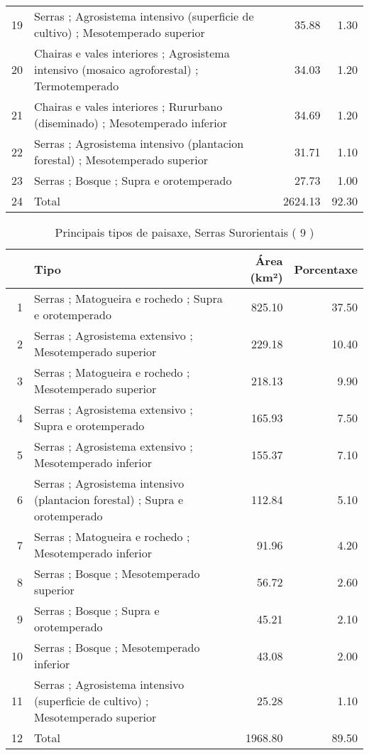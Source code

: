 \begin{table}[p]
\begin{tabular}{rlrr}
  19 & Serras ; Agrosistema intensivo (superficie de cultivo) ; Mesotemperado superior & 35.88 & 1.30 \\ 
  20 & Chairas e vales interiores ; Agrosistema intensivo (mosaico agroforestal) ; Termotemperado & 34.03 & 1.20 \\ 
  21 & Chairas e vales interiores ; Rururbano (diseminado) ; Mesotemperado inferior & 34.69 & 1.20 \\ 
  22 & Serras ; Agrosistema intensivo (plantacion forestal) ; Mesotemperado superior & 31.71 & 1.10 \\ 
  23 & Serras ; Bosque ; Supra e orotemperado & 27.73 & 1.00 \\ 
  24 & Total & 2624.13 & 92.30 \\ 
   \hline
\end{tabular}
\end{table}
\begin{table}[p]
\centering
\caption{Principais tipos de paisaxe,  Serras Surorientais ( 9 )} 
\label{Tipos 9}
\begin{tabular}{rlrr}
  \hline
 & Tipo & Área (km²) & Porcentaxe \\ 
  \hline
1 & Serras ; Matogueira e rochedo ; Supra e orotemperado & 825.10 & 37.50 \\ 
  2 & Serras ; Agrosistema extensivo ; Mesotemperado superior & 229.18 & 10.40 \\ 
  3 & Serras ; Matogueira e rochedo ; Mesotemperado superior & 218.13 & 9.90 \\ 
  4 & Serras ; Agrosistema extensivo ; Supra e orotemperado & 165.93 & 7.50 \\ 
  5 & Serras ; Agrosistema extensivo ; Mesotemperado inferior & 155.37 & 7.10 \\ 
  6 & Serras ; Agrosistema intensivo (plantacion forestal) ; Supra e orotemperado & 112.84 & 5.10 \\ 
  7 & Serras ; Matogueira e rochedo ; Mesotemperado inferior & 91.96 & 4.20 \\ 
  8 & Serras ; Bosque ; Mesotemperado superior & 56.72 & 2.60 \\ 
  9 & Serras ; Bosque ; Supra e orotemperado & 45.21 & 2.10 \\ 
  10 & Serras ; Bosque ; Mesotemperado inferior & 43.08 & 2.00 \\ 
  11 & Serras ; Agrosistema intensivo (superficie de cultivo) ; Mesotemperado superior & 25.28 & 1.10 \\ 
  12 & Total & 1968.80 & 89.50 \\ 
   \hline
\end{tabular}
\end{table}
